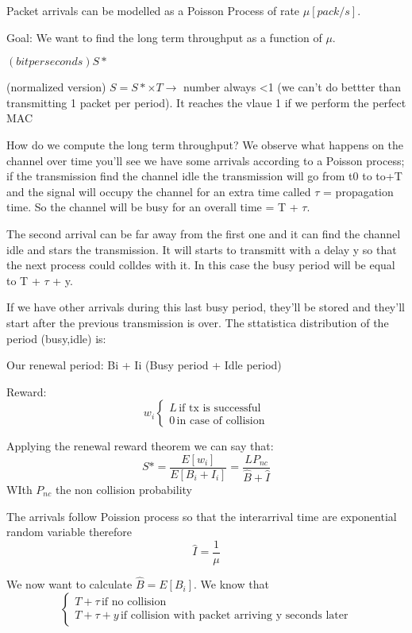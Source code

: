 Packet arrivals can be modelled as a Poisson Process of rate $\mu [pack/s].$

Goal: We want to find the long term throughput as a function of $\mu$.

$(bit per seconds) S*$

(normalized version) $S = S*\times T \rightarrow$ number always <1 (we can't do bettter than transmitting 1 packet per period). It reaches the vlaue 1 if we perform the perfect MAC

How do we compute the long term throughput? We observe what happens on the channel over time you'll see we have some arrivals according to a Poisson process; if the transmission find the channel idle the transmission will go from t0 to to+T and the signal will occupy the channel for an extra time called $\tau$ = propagation time. So the channel will be busy for an overall time = T + $\tau$. 

The second arrival can be far away from the first one and it can find the channel idle and stars the transmission. It will starts to transmitt with a delay y so that the next process could colldes with it. In this case the busy period will be equal to T + $\tau$ + y.

If we have other arrivals during this last busy period, they'll be stored and they'll start after the previous transmission is over. The sttatistica distribution of the period (busy,idle) is:

Our renewal period: Bi + Ii (Busy period + Idle period)

Reward: 
\begin{equation}{w_i}
\begin{cases}
L \, \text{if tx is successful}\\
0 \, \text{in case of collision}
\end{cases}
\end{equation}

Applying the renewal reward theorem we can say that:
\begin{equation}
S* = \frac{E[w_i]}{E[B_i+I_i]} =\frac{LP_{nc}}{\hat{B}+\hat{I}} 
\end{equation}
WIth $P_{nc}$ the non collision probability

The arrivals follow Poission process so that the interarrival time are exponential random variable therefore
\begin{equation}
\hat{I} = \frac{1}{\mu}
\end{equation}

We now want to calculate $\hat{B} = E[B_i]$. We know that
\begin{equation}
\begin{cases}
T+\tau \, \text{if no collision}\\
T+\tau + y \, \text{if collision with packet arriving y seconds later}
\end{cases}
\end{equation}

